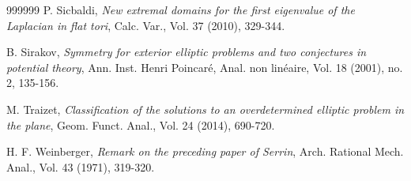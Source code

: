 \documentclass[11pt]{article}
\def\s{\hbox{\bb S}}
\numberwithin{equation} {section}
\begin{document}
\begin{thebibliography}{999999}
	 P. Sicbaldi, \emph{New extremal domains for the first eigenvalue of the Laplacian in flat tori}, Calc. Var., Vol. 37 (2010), 329-344.
	
	 B. Sirakov, \emph{Symmetry for exterior elliptic problems and two conjectures in potential theory}, Ann. Inst. Henri Poincar\'e, Anal. non lin\'eaire, Vol. 18 (2001), no. 2, 135-156.
	
	
	
	
	 M. Traizet, \emph{Classification of the solutions to an overdetermined elliptic problem in the plane}, Geom. Funct. Anal., Vol. 24 (2014), 690-720.
	
	 H. F. Weinberger, \emph{Remark on the preceding paper of Serrin}, Arch. Rational Mech. Anal., Vol. 43 (1971), 319-320.
	
\end{thebibliography}
	
\end{document}
